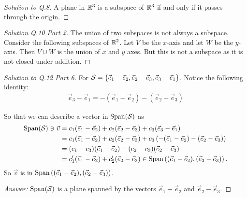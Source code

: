   \begin{proof}[Solution to Q.8]
    A plane in $\mathbb{R}^3$ is a subspace of $\mathbb{R}^3$ if and only if it passes through the origin.
  \end{proof}

  \begin{proof}[Solution Q.10 Part 2]
    The union of two subspaces is not always a subspace.
    Consider the following subspaces of $\mathbb{R}^2$. Let $V$ be the $x$-axis and let $W$ be the $y$-axis.
    Then $V \cup W$ is the union of $x$ and $y$ axes. But this is not a subspace as it is not closed under addition.
  \end{proof}

  \begin{proof}[Solution to Q.12 Part 6]
    For $\mathcal{S} = \{ \vec{e}_1 - \vec{e}_2, \vec{e}_2 - \vec{e}_3, \vec{e}_3 - \vec{e}_1\}$.
    Notice the following identity:
    \begin{align*}
      \vec{e}_3 - \vec{e}_1 = -(\vec{e}_1 - \vec{e}_2) - (\vec{e}_2 - \vec{e}_3)
    \end{align*}
    \begin{figure}[H]
      \centering
    \end{figure}

    So that we can describe a vector in $\operatorname{Span}(\mathcal{S})$ as
    \begin{align*}
      \operatorname{Span}(\mathcal{S}) \ni \vec{v}
      &=c_1(\vec{e}_1 - \vec{e}_2) + c_2 (\vec{e}_2 - \vec{e}_3) + c_3 (\vec{e}_3 - \vec{e}_1) \\
      &= c_1(\vec{e}_1 - \vec{e}_2) + c_2 (\vec{e}_2 - \vec{e}_3) + c_3 \left(-(\vec{e}_1 - \vec{e}_2) - (\vec{e}_2 - \vec{e}_3)\right) \\
      &= (c_1-c_3)(\vec{e}_1 - \vec{e}_2) + (c_2-c_3) (\vec{e}_2 - \vec{e}_3) \\
      &= c_1'(\vec{e}_1 - \vec{e}_2) + c_2'(\vec{e}_2 - \vec{e}_3)
      \in \operatorname{Span}\left((\vec{e}_1 - \vec{e}_2),(\vec{e}_2 - \vec{e}_3)\right).
    \end{align*}
    So $\vec{v}$ is in $\operatorname{Span}\left((\vec{e}_1 - \vec{e}_2),(\vec{e}_2 - \vec{e}_3)\right)$.

    \emph{Answer:} $\operatorname{Span}(\mathcal{S})$ is a plane spanned by the vectors $\vec{e}_1 - \vec{e}_2$ and $\vec{e}_2 - \vec{e}_3$.
  \end{proof}
